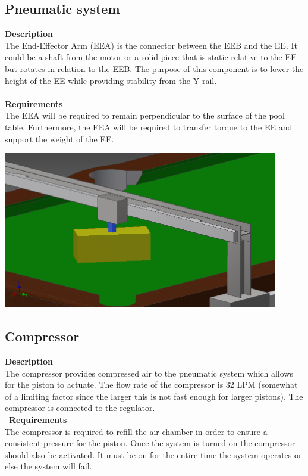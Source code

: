 \documentclass[titlepage]{article}
\begin{document}
\subsection{Pneumatic system}
\textbf{Description}\\
The End-Effector Arm (EEA) is the connector between the EEB and the EE. It could be a shaft from the motor or a solid piece that is static relative to the EE but rotates in relation to the EEB. The purpose of this component is to lower the height of the EE while providing stability from the Y-rail.\\~\\
\textbf{Requirements}\\
The EEA will be required to remain perpendicular to the surface of the pool table. Furthermore, the EEA will be required to transfer torque to the EE and support the weight of the EE.
\begin{center}
	\includegraphics[width = 0.9\textwidth]{efArm.png}	%
\label{fig:eeaFig}
\end{center}

\subsection{Compressor}
\textbf{Description}\\
The compressor provides compressed air to the pneumatic system which allows for the piston to actuate. The flow rate of the compressor is 32 LPM (somewhat of a limiting factor since the larger this is not fast enough for larger pistons). The compressor is connected to the regulator.\\\
\textbf{Requirements}\\
The compressor is required to refill the air chamber in order to ensure a consistent pressure for the piston. Once the system is turned on the compressor should also be activated. It must be on for the entire time the system operates or else the system will fail.
\end{document}
